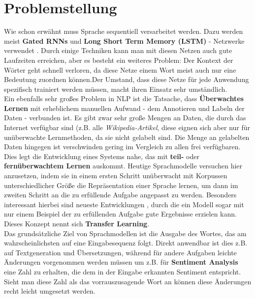 \section{Problemstellung}
Wie schon erw\"ahnt muss Sprache sequentiell versarbeitet werden. Dazu werden meist \textbf{Gated RNNs} und \textbf{Long Short Term Memory (LSTM)} - Netzwerke verwendet \cite{attention}. Durch einige Techniken kann man mit diesen Netzen auch gute Laufzeiten erreichen, aber es besteht ein weiteres Problem: Der Kontext der W\"orter geht schnell verloren, da diese Netze einem Wort meist auch nur eine Bedeutung zuordnen k\"onnen.Der Umstand, dass diese Netze f\"ur jede Anwendung spezifisch trainiert werden m\"ussen, macht ihren Einsatz sehr umst\"andlich.\\
Ein ebenfalls sehr gro{\ss}es Problem in NLP ist die Tatsache, dass \textbf{\"Uberwachtes Lernen} mit erheblichem manuellen Aufwand - dem Annotieren und Labeln der Daten - verbunden ist. Es gibt zwar sehr gro{\ss}e Mengen an Daten, die durch das Internet verf\"ugbar sind (z.B. alle \textit{Wikipedia-Artikel}, diese eignen sich aber nur f\"ur un\"uberwachte Lernmethoden, da sie nicht gelabelt sind. Die Menge an gelabelten Daten hingegen ist verschwinden gering im Vergleich zu allen frei verf\"ugbaren. Dies legt die Entwicklung eines Systems nahe, das mit \textbf{teil-} oder \textbf{fern\"uberwachtem Lernen} auskommt. Heutige Sprachmodelle versuchen hier anzusetzen, indem sie in einem ersten Schritt un\"uberwacht mit Korpussen unterschiedlicher Gr\"o{\ss}e die Repr\"asentation einer Sprache lernen, um dann im zweiten Schritt an die zu erf\"ullende Aufgabe angepasst zu werden. Besonders interessant hierbei sind neueste Entwicklungen \cite{gpt3}, durch die ein Modell sogar mit nur einem Beispiel der zu erf\"ullenden Aufgabe gute Ergebnisse erzielen kann. Dieses Konzept nennt sich \textbf{Transfer Learning}.\\
Das grunds\"atzliche Ziel von Sprachmodellen ist die Ausgabe des Wortes, das am wahrscheinlichsten auf eine Eingabesequenz folgt. Direkt anwendbar ist dies z.B. auf Textgeneration und \"Ubersetzungen, w\"ahrend f\"ur andere Aufgaben leichte \"Anderungen vorgenommen werden m\"ussen um z.B. f\"ur \textbf{Sentiment Analysis} eine Zahl zu erhalten, die dem in der Eingabe erkannten Sentiment entspricht. Sieht man diese Zahl als das vorrauszusagende Wort an k\"onnen diese \"Anderungen recht leicht umgesetzt werden.


